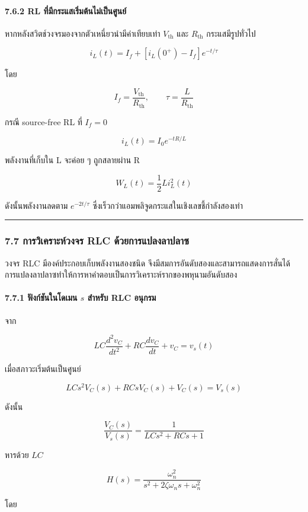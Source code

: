 \paragraph{7.6.2 RL ที่มีกระแสเริ่มต้นไม่เป็นศูนย์}

หากหลังสวิตช์วงจรมองจากตัวเหนี่ยวนำมีค่าเทียบเท่า $V_{\text{th}}$ และ $R_{\text{th}}$ กระแสมีรูปทั่วไป

\[
\boxed{i_L(t)=I_f+[i_L(0^+)-I_f]e^{-t/\tau}}
\]

โดย

\[
I_f=\frac{V_{\text{th}}}{R_{\text{th}}},\qquad \tau=\frac{L}{R_{\text{th}}}
\]

กรณี source-free RL ที่ $I_f=0$

\[
\boxed{i_L(t)=I_0e^{-tR/L}}
\]

พลังงานที่เก็บใน L จะค่อย ๆ ถูกสลายผ่าน R

\[
W_L(t)=\frac{1}{2}Li_L^2(t)
\]

ดังนั้นพลังงานลดตาม $e^{-2t/\tau}$ ซึ่งเร็วกว่าแอมพลิจูดกระแสในเชิงเลขชี้กำลังสองเท่า

\par\noindent\rule{\textwidth}{0.4pt}\par

\subsubsection{7.7 การวิเคราะห์วงจร RLC ด้วยการแปลงลาปลาซ}

วงจร RLC มีองค์ประกอบเก็บพลังงานสองชนิด จึงมีสมการอันดับสองและสามารถแสดงการสั่นได้ การแปลงลาปลาซทำให้การหาคำตอบเป็นการวิเคราะห์รากของพหุนามอันดับสอง

\paragraph{7.7.1 ฟังก์ชันในโดเมน $s$ สำหรับ RLC อนุกรม}

จาก

\[
LC\frac{d^2v_C}{dt^2}+RC\frac{dv_C}{dt}+v_C=v_s(t)
\]

เมื่อสภาวะเริ่มต้นเป็นศูนย์

\[
LCs^2V_C(s)+RCsV_C(s)+V_C(s)=V_s(s)
\]

ดังนั้น

\[
\boxed{\frac{V_C(s)}{V_s(s)}=\frac{1}{LCs^2+RCs+1}}
\]

หารด้วย $LC$

\[
\boxed{H(s)=\frac{\omega_n^2}{s^2+2\zeta\omega_ns+\omega_n^2}}
\]

โดย

